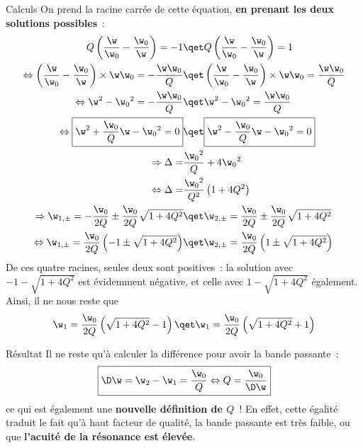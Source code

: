 \documentclass[../main/main.tex]{subfiles}
\begin{document}
\begin{rexem}{Calculs}
    On prend la racine carrée de cette équation, \textbf{en prenant les deux
    solutions possibles}~:
    \begin{align*}
        Q\left( \frac{\w}{\w_0} - \frac{\w_0}{\w} \right) = -1
        &\qet
        Q\left( \frac{\w}{\w_0} - \frac{\w_0}{\w} \right) = 1\\
        \Leftrightarrow
        \left( \frac{\w}{\w_0} - \frac{\w_0}{\w} \right)\times \w\w_0 =
            - \frac{\w\w_0}{Q}
        &\qet
        \left( \frac{\w}{\w_0} - \frac{\w_0}{\w} \right)\times \w\w_0 =
            \frac{\w\w_0}{Q}\\
        \Leftrightarrow
        \w^2 - \w_0{}^2 = -\frac{\w\w_0}{Q}
        &\qet
        \w^2 - \w_0{}^2 = \frac{\w\w_0}{Q}\\
        \Leftrightarrow
        \boxed{
        \w^2 + \frac{\w_0}{Q}\w - \w_0{}^2 = 0}
        &\qet
        \boxed{
        \w^2 - \frac{\w_0}{Q}\w - \w_0{}^2 = 0}\\
        \Rightarrow
        \Delta = &\frac{\w_0{}^2}{Q} + 4\w_0{}^2\\
        \Leftrightarrow
        \Delta = &\frac{\w_0{}^2}{Q^2} \left( 1 + 4Q^2 \right)\\
        \Rightarrow
        \w_{1,\pm} = -\frac{\w_0}{2Q} \pm \frac{\w_0}{2Q} \sqrt{1+4Q^2}
        &\qet
        \w_{2,\pm} = \frac{\w_0}{2Q} \pm \frac{\w_0}{2Q} \sqrt{1+4Q^2}\\
        \Leftrightarrow
        \w_{1,\pm} = \frac{\w_0}{2Q} \left(-1 \pm \sqrt{1+4Q^2}\right)
        &\qet
        \w_{2,\pm} = \frac{\w_0}{2Q} \left(1 \pm \sqrt{1+4Q^2}\right)
    \end{align*}
    De ces quatre racines, seules deux sont positives~: la solution avec $-1 -
    \sqrt{1+4Q^2}$ est évidemment négative, et celle avec $1 - \sqrt{1+4Q^2}$
    également. Ainsi, il ne nous reste que
    \begin{gather*}
        \w_1 = \frac{\w_0}{2Q} \left( \sqrt{1+4Q^2}-1 \right)
        \qet
        \w_1 = \frac{\w_0}{2Q} \left( \sqrt{1+4Q^2}+1 \right)
    \end{gather*}
\end{rexem}

\begin{rprop}{Résultat}
    Il ne reste qu'à calculer la différence pour avoir la bande passante~:
    \begin{gather*}
        \boxed{\D\w = \w_2 - \w_1 = \frac{\w_0}{Q}
            \Leftrightarrow
            Q = \frac{\w_0}{\D\w}
        }
    \end{gather*}
    ce qui est également une \textbf{nouvelle définition de $Q$}~! En effet, cette
    égalité traduit le fait qu'à haut facteur de qualité, la bande passante est très
    faible, ou que \textbf{l'acuité de la résonance est élevée}.
\end{rprop}
\end{document}
